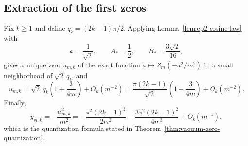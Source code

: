 \subsection{Extraction of the first zeros}

Fix $k\ge1$ and define $q_k=(2k-1)\pi/2$.
Applying Lemma~\ref{lem:ep2-cosine-law} with
\[
a=\frac{1}{\sqrt2},
\qquad
A_*=\frac12,
\qquad
B_*=\frac{3\sqrt2}{16},
\]
gives a unique zero $u_{m,k}$ of the exact function $u\mapsto Z_m(-u^2/m^2)$ in a small neighborhood of \(\sqrt2\,q_k\), and
\[
u_{m,k}
=
\sqrt2\,q_k\left(1+\frac{3}{4m}\right)+O_k(m^{-2})
=
\frac{\pi(2k-1)}{\sqrt2}\left(1+\frac{3}{4m}\right)+O_k(m^{-2}).
\]
Finally,
\[
y_{m,k}=-\frac{u_{m,k}^2}{m^2}
=
-\frac{\pi^2(2k-1)^2}{2m^2}
-\frac{3\pi^2(2k-1)^2}{4m^3}
+O_k(m^{-4}),
\]
which is the quantization formula stated in Theorem~\ref{thm:vacuum-zero-quantization}.
